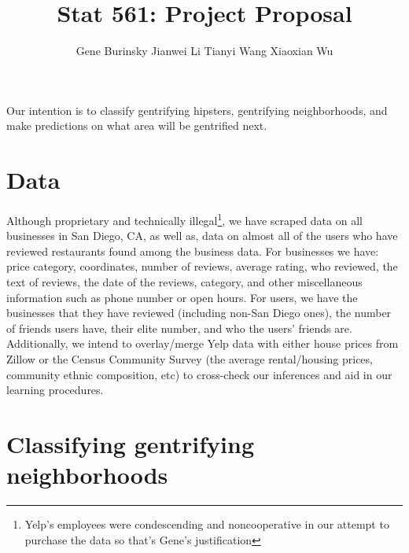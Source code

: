 \documentclass[11pt,a4paper]{article}
\author{Gene Burinsky Jianwei Li Tianyi Wang Xiaoxian Wu}
\title{Stat 561: Project Proposal}
\begin{document}
	\maketitle
	
	Our intention is to classify gentrifying hipsters, gentrifying neighborhoods, and make predictions on what area will be gentrified next. 
	\section{Data}
	Although proprietary and technically illegal\footnote{Yelp's employees were condescending and noncooperative in our attempt to purchase the data so that's Gene's justification}, we have scraped data on all businesses in San Diego, CA, as well as, data on almost all of the users who have reviewed restaurants found among the business data. For businesses we have: price category, coordinates, number of reviews, average rating, who reviewed, the text of reviews, the date of the reviews, category, and other miscellaneous information such as phone number or open hours. For users, we have the businesses that they have reviewed (including non-San Diego ones), the number of friends users have, their elite number, and who the users' friends are. Additionally, we intend to overlay/merge Yelp data with either house prices from Zillow or the Census Community Survey (the average rental/housing prices, community ethnic composition, etc) to cross-check our inferences and aid in our learning procedures. 
	
	
	\section{Classifying gentrifying neighborhoods}
	
\end{document}
